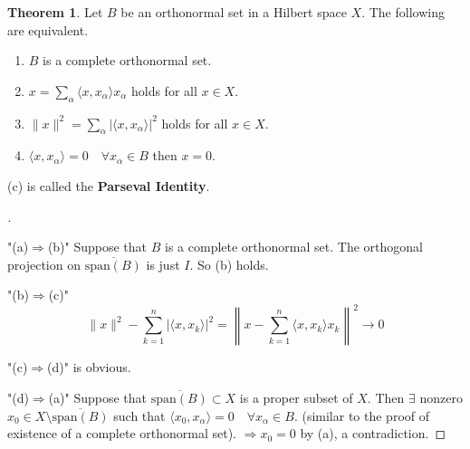 \documentclass{article}
\theoremstyle{definition}
\newtheorem{thm}{Theorem}
\newenvironment{proofs}[1][\proofname]{%
  \begin{proof}[#1]$ $\par\nobreak\ignorespaces
}{%
  \end{proof}
}
\begin{document}
\begin{thm}
	Let $B$ be an orthonormal set in a Hilbert space $X$.
	The following are equivalent.
	\begin{enumerate}
		\item[(a)] $B$ is a complete orthonormal set.

		\item[(b)] $x = \sum_\alpha \langle x, x_\alpha \rangle x_\alpha$ holds for all $x \in X$.

		\item[(c)] $\|x\|^2 = \sum_\alpha |\langle x, x_\alpha \rangle|^2$ holds for all $x \in X$.

		\item[(d)] $\langle x, x_\alpha \rangle = 0 \quad \forall x_\alpha \in B$ then $x = 0$.
	\end{enumerate}
	(c) is called the \textbf{Parseval Identity}.
\end{thm}

\begin{proofs}
	\par "(a)$\Rightarrow$(b)" Suppose that $B$ is a complete orthonormal set.
	The orthogonal projection on $\overline{\text{span}(B)}$ is just $I$.
	So (b) holds.

	\par "(b)$\Rightarrow$(c)" 
	\[
		\|x\|^2 - \sum_{k = 1}^n |\langle x, x_k \rangle |^2 = \left\|x - \sum_{k = 1}^n \langle x, x_k \rangle x_k \right\|^2 \to 0
	\]

	\par "(c)$\Rightarrow$(d)" is obvious.

	\par "(d)$\Rightarrow$(a)" Suppose that $\overline{\text{span}(B)} \subset X$ is a proper subset of $X$.
	Then $\exists$ nonzero $x_0 \in X \setminus \overline{\text{span}(B)}$ such that $\langle x_0, x_\alpha \rangle = 0 \quad \forall x_\alpha \in B$.
	(similar to the proof of existence of a complete orthonormal set).
	$\Rightarrow x_0 = 0$ by (a), a contradiction.
\end{proofs}
\end{document}
